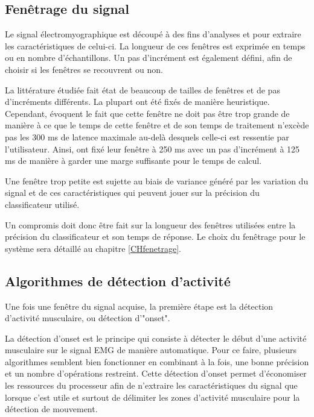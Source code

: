 \documentclass[letterpaper, twoside, 12pt, memoire, creativecommons, hyperref]{thETS}
\begin{document}
\subsection{Fenêtrage du signal}

Le signal électromyographique est découpé à des fins d'analyses et pour extraire les caractéristiques de celui-ci. La longueur de ces fenêtres est exprimée en temps ou en nombre d'échantillons. Un pas d’incrément est également défini, afin de choisir si les fenêtres se recouvrent ou non. 

La littérature étudiée fait état de beaucoup de tailles de fenêtres et de pas d’incréments différents. La plupart ont été fixés de manière heuristique. Cependant, \cite{Englehart2003} évoquent le fait que cette fenêtre ne doit pas être trop grande de manière à ce que le temps de cette fenêtre et de son temps de traitement n’excède pas les 300 ms de latence maximale au-delà desquels celle-ci est ressentie par l’utilisateur. Ainsi, \cite{Englehart2003} ont fixé leur fenêtre à 250 ms avec un pas d’incrément à 125 ms de manière à garder une marge suffisante pour le temps de calcul. 

Une fenêtre trop petite est sujette au biais de variance généré par les variation du signal et de ces caractéristiques qui peuvent jouer sur la précision du classificateur utilisé.

Un compromis doit donc être fait sur la longueur des fenêtres utilisées entre la  précision du classificateur et son temps de réponse. Le choix du fenêtrage pour le système sera détaillé au chapitre \ref{CHfenetrage}.

\subsection{Algorithmes de détection d'activité}

Une fois une fenêtre du signal acquise, la première étape est la détection d'activité musculaire, ou détection d'"onset". 

La détection d’onset est le principe qui consiste à détecter le début d’une activité musculaire sur le signal EMG de manière automatique.  Pour ce faire, plusieurs algorithmes semblent bien fonctionner en combinant à la fois, une bonne précision et un nombre d’opérations restreint. Cette détection d’onset permet d’économiser les ressources du processeur afin  de n’extraire les caractéristiques du signal que lorsque c’est utile et surtout de délimiter les zones d’activité musculaire pour la détection de mouvement. 
\end{document}
